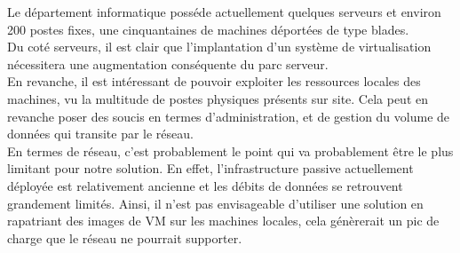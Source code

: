 Le département informatique posséde actuellement quelques serveurs et environ 200 postes fixes, une cinquantaines de machines déportées de type blades.\\
Du coté serveurs, il est clair que l'implantation d'un système de virtualisation nécessitera une augmentation conséquente du parc serveur.\\
En revanche, il est intéressant de pouvoir exploiter les ressources locales des machines, vu la multitude de postes physiques présents sur site. Cela peut en revanche poser des soucis en termes d'administration, et de gestion du volume de données qui transite par le réseau.\\
En termes de réseau, c'est probablement le point qui va probablement être le plus limitant pour notre solution. En effet, l'infrastructure passive actuellement déployée est relativement ancienne et les débits de données se retrouvent grandement limités. Ainsi, il n'est pas envisageable d'utiliser une solution en rapatriant des images de VM sur les machines locales, cela génèrerait un pic de charge que le réseau ne pourrait supporter.\\

